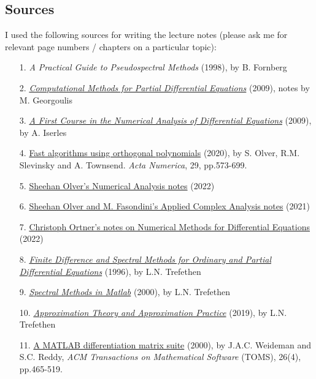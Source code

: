 \documentclass[12pt,a4paper]{article}
\begin{document}
\subsection{Sources}
I used the following sources for writing the lecture notes (please ask me for relevant page numbers / chapters on a particular topic):

\begin{itemize}
\item[1.  ] \emph{A Practical Guide to Pseudospectral Methods} (1998), by B. Fornberg


\item[2.  ] \href{http://users.math.uoc.gr/~tsogka/Courses/AEMDE-fall2015/Biblio/Georgoulis_notes_new.pdf}{\emph{Computational Methods for Partial Differential Equations}} (2009), notes by M. Georgoulis


\item[3.  ] \href{https://le.ac.uk/library}{\emph{A First Course in the Numerical Analysis of Differential Equations}} (2009), by A. Iserles 


\item[4.  ] \href{https://le.ac.uk/library}{Fast algorithms using orthogonal polynomials} (2020), by S. Olver, R.M. Slevinsky and A. Townsend. \emph{Acta Numerica}, 29, pp.573-699. 


\item[5.  ] \href{https://github.com/Imperial-MATH50003/MATH50003NumericalAnalysis2122}{Sheehan Olver's Numerical Analysis notes} (2022)


\item[6.  ] \href{https://github.com/MarcoFasondini/M3M6AppliedComplexAnalysis}{Sheehan Olver and M. Fasondini's Applied Complex Analysis notes} (2021)


\item[7.  ] \href{https://github.com/cortner/math405_2022}{Christoph Ortner's notes on Numerical Methods for Differential Equations} (2022)


\item[8.  ] \href{https://people.maths.ox.ac.uk/trefethen/pdetext.html}{\emph{Finite Difference and Spectral Methods for Ordinary and Partial Differential Equations}} (1996), by L.N. Trefethen


\item[9.  ] \href{https://people.maths.ox.ac.uk/trefethen/spectral.html}{\emph{Spectral Methods in Matlab}} (2000), by L.N. Trefethen


\item[10. ] \href{https://people.maths.ox.ac.uk/trefethen/ATAP/}{\emph{Approximation Theory and Approximation Practice}} (2019), by L.N. Trefethen


\item[11. ] \href{https://le.ac.uk/library}{A MATLAB differentiation matrix suite} (2000), by J.A.C.  Weideman and S.C. Reddy,  \emph{ACM Transactions on Mathematical Software} (TOMS), 26(4), pp.465-519.

\end{itemize}
\end{document}
